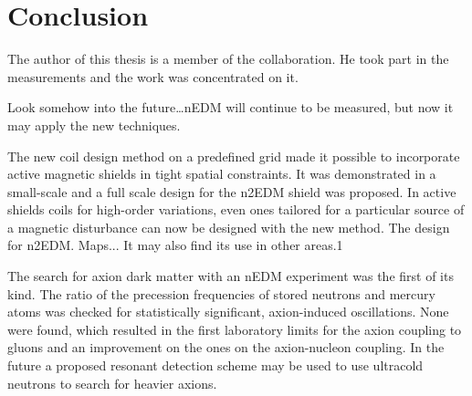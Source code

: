 
\begingroup

\let\clearpage\relax
\let\cleardoublepage\relax
\let\cleardoublepage\relax

\chapter*{Conclusion}
The author of this thesis is a member of the collaboration.
He took part in the measurements and the work was concentrated on it.

Look somehow into the future\ldots nEDM will continue to be measured, but now it may apply the new techniques.

The new coil design method on a predefined grid made it possible to incorporate active magnetic shields in tight spatial constraints. It was demonstrated in a small-scale and a full scale design for the n2EDM shield was proposed. In active shields coils for high-order variations, even ones tailored for a particular source of a magnetic disturbance can now be designed with the new method.
The design for n2EDM. Maps...
It may also find its use in other areas.1

The search for axion dark matter with an nEDM experiment was the first of its kind. The ratio of the precession frequencies of stored neutrons and mercury atoms was checked for statistically significant, axion-induced oscillations. None were found, which resulted in the first laboratory limits for the axion coupling to gluons and an improvement on the ones on the axion-nucleon coupling. In the future a proposed resonant detection scheme may be used to use ultracold neutrons to search for heavier axions.

\endgroup